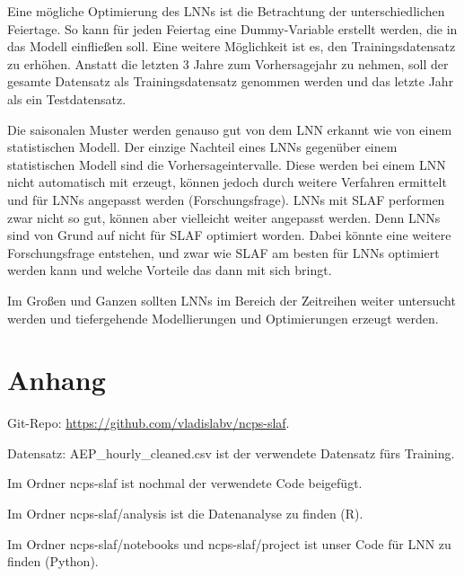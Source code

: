 \documentclass[11pt,ngerman,a4paper,]{article}
\begin{document}
Eine mögliche Optimierung des LNNs ist die Betrachtung der unterschiedlichen Feiertage. So kann für jeden Feiertag eine Dummy-Variable erstellt werden, die in das Modell einfließen soll. Eine weitere Möglichkeit ist es, den Trainingsdatensatz zu erhöhen. Anstatt die letzten 3 Jahre zum Vorhersagejahr zu nehmen, soll der gesamte Datensatz als Trainingsdatensatz genommen werden und das letzte Jahr als ein Testdatensatz.

Die saisonalen Muster werden genauso gut von dem LNN erkannt wie von einem statistischen Modell. Der einzige Nachteil eines LNNs gegenüber einem statistischen Modell sind die Vorhersageintervalle. Diese werden bei einem LNN nicht automatisch mit erzeugt, können jedoch durch weitere Verfahren ermittelt und für LNNs angepasst werden (Forschungsfrage). LNNs mit SLAF performen zwar nicht so gut, können aber vielleicht weiter angepasst werden. Denn LNNs sind von Grund auf nicht für SLAF optimiert worden. Dabei könnte eine weitere Forschungsfrage entstehen, und zwar wie SLAF am besten für LNNs optimiert werden kann und welche Vorteile das dann mit sich bringt.

Im Großen und Ganzen sollten LNNs im Bereich der Zeitreihen weiter untersucht werden und tiefergehende Modellierungen und Optimierungen erzeugt werden.

\clearpage
\newpage

\section{Anhang}\label{anhang}

Git-Repo: \url{https://github.com/vladislabv/ncps-slaf}.

Datensatz: AEP\_hourly\_cleaned.csv ist der verwendete Datensatz fürs Training.

Im Ordner ncps-slaf ist nochmal der verwendete Code beigefügt.

Im Ordner ncps-slaf/analysis ist die Datenanalyse zu finden (R).

Im Ordner ncps-slaf/notebooks und ncps-slaf/project ist unser Code für LNN zu finden (Python).

\newpage
\printbibliography
\end{document}
